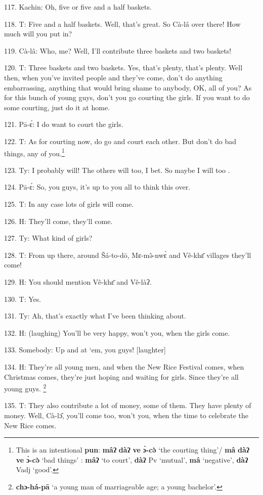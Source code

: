 117. Kachin: Oh, five or five and a half baskets.

118. T: Five and a half baskets. Well, that's great. So Cà-lâ over there!
How much will you put in?

119. Cà-lâ: Who, me? Well, I'll contribute three baskets and two baskets!

120. T: Three baskets and two baskets. Yes, that's plenty, that's plenty.
Well then, when you've invited people and they've come, don't do anything embarrassing,
anything that would bring shame to anybody, OK, all of you? As for this bunch
of young guys, don't you go courting the girls. If you want to do some courting,
just do it at home.

121. Pā-ɛ́: I do want to court the girls. 

122. T: As for courting now, do go and court each other. But don't do bad things,
any of you.\footnote{This is an intentional \textbf{pun}: \textbf{mâʔ} \textbf{dàʔ} \textbf{ve} \textbf{ɔ̀-cə̀} `the courting thing'/ \textbf{mâ} \textbf{dàʔ} \textbf{ve} \textbf{ɔ̀-cə̀} `bad things' : \textbf{mâʔ} `to court', \textbf{dàʔ} Pv `mutual', \textbf{mâ} `negative', \textbf{dàʔ} Vadj `good'.}

123. Ty: I probably will! The others will too, I bet. So maybe I will too
.

124. Pā-ɛ́: So, you guys, it's up to you all to think this over.

125. T: In any case lots of girls will come.

126. H: They'll come, they'll come.

127. Ty: What kind of girls?

128. T: From up there, around Šá-to-dō, Mɛ-mə̂-nwɛ̀ and Vê-khɛ̄ villages
they'll come!

129. H: You should mention Vê-khɛ̄ and Vê-làʔ.

130. T: Yes.

131. Ty: Ah, that's exactly what I've been thinking about.

132. H: (laughing) You'll be very happy, won't you, when the girls come.

133. Somebody: Up and at `em, you guys! [laughter]

134. H: They're all young men, and when the New Rice Festival comes, when Christmas
comes, they're just hoping and waiting for girls. Since they're all young guys.
\footnote{\textbf{chɔ-há-pā} `a young man of marriageable age; a young bachelor'.}

135. T: They also contribute a lot of money, some of them. They have plenty of
money. Well, Cà-lɔ̂, you'll come too, won't you, when the time to celebrate
the New Rice comes.


